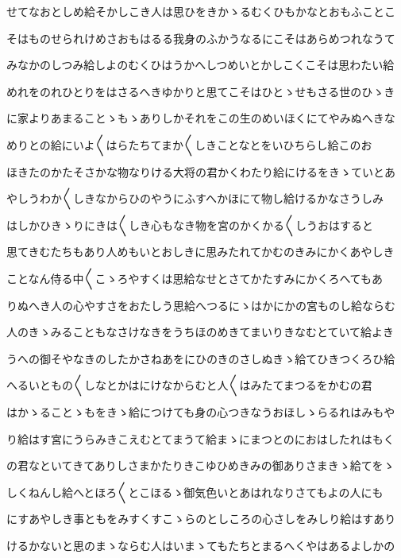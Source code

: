 \documentclass[a4paper,11pt,landscape]{ltjtarticle}
\begin{document}
\par\medskip
せてなおとしめ給そかしこき人は思ひをきかゝるむくひもかなとおもふことこ
\par\medskip
そはものせられけめさおもはるる我身のふかうなるにこそはあらめつれなうて
\par\medskip
みなかのしつみ給しよのむくひはうかへしつめいとかしこくこそは思わたい給
\par\medskip
めれをのれひとりをはさるへきゆかりと思てこそはひとゝせもさる世のひゝき
\par\medskip
に家よりあまることゝもゝありしかそれをこの生のめいほくにてやみぬへきな
\par\medskip
めりとの給にいよ〱はらたちてまか〱しきことなとをいひちらし給このお
\par\medskip
ほきたのかたそさかな物なりける大将の君かくわたり給にけるをきゝていとあ
\par\medskip
やしうわか〱しきなからひのやうにふすへかほにて物し給けるかなさうしみ
\par\medskip
はしかひきゝりにきは〱しき心もなき物を宮のかくかる〱しうおはすると
\par\medskip
思てきむたちもあり人めもいとおしきに思みたれてかむのきみにかくあやしき
\par\medskip
ことなん侍る中〱こゝろやすくは思給なせとさてかたすみにかくろへてもあ
\par\medskip
りぬへき人の心やすさをおたしう思給へつるにゝはかにかの宮ものし給ならむ
\par\medskip
人のきゝみることもなさけなきをうちほのめきてまいりきなむとていて給よき
\par\medskip
うへの御そやなきのしたかさねあをにひのきのさしぬきゝ給てひきつくろひ給
\par\medskip
へるいともの〱しなとかはにけなからむと人〱はみたてまつるをかむの君
\par\medskip
はかゝることゝもをきゝ給につけても身の心つきなうおほしゝらるれはみもや
\par\medskip
り給はす宮にうらみきこえむとてまうて給まゝにまつとのにおはしたれはもく
\par\medskip
の君なといてきてありしさまかたりきこゆひめきみの御ありさまきゝ給てをゝ
\par\medskip
しくねんし給へとほろ〱とこほるゝ御気色いとあはれなりさてもよの人にも
\par\medskip
にすあやしき事ともをみすくすこゝらのとしころの心さしをみしり給はすあり
\par\medskip
けるかないと思のまゝならむ人はいまゝてもたちとまるへくやはあるよしかの
\par\medskip
\end{document}
